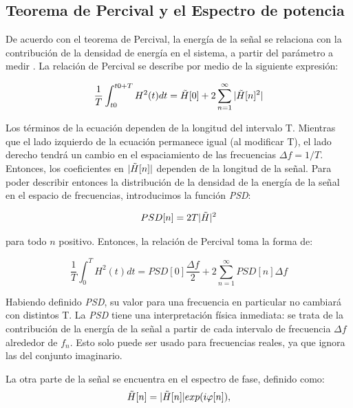 \subsection{Teorema de Percival y el Espectro de potencia}
\label{psd_section}
De acuerdo con el teorema de Percival, la energía de la señal se relaciona con la contribución de la densidad de energía en el sistema, a partir del parámetro a medir \parencite{book_analysis_Method_multiSp_data}. La relación de Percival se describe por medio de la siguiente expresión: 

\begin{equation}
    \frac{1}{T} \int_{t0}^{t0+T} H^2(t)dt = \Tilde{H}[0] + 2 \sum_{n=1}^\infty |\Tilde{H}[n]^2|
\end{equation}

Los términos de la ecuación dependen de la longitud del intervalo T. Mientras que el lado izquierdo de la ecuación permanece igual (al modificar T), el lado derecho tendrá un cambio en el espaciamiento de las frecuencias $\Delta f = 1/T$. Entonces, los coeficientes en $|\Tilde{H}[n]|$ dependen de la longitud de la señal. Para poder describir entonces la distribución de la densidad de la energía de la señal en el espacio de frecuencias, introducimos la función \emph{PSD}:

\begin{equation}
    PSD[n] = 2T |\Tilde{H}|^2
\end{equation}

para todo $n$ positivo. Entonces, la relación de Percival toma la forma de:

\begin{equation}
    \frac{1}{T} \int_0^T H^2 (t)dt = PSD[0] \frac{\Delta f}{2} +2 \sum_{n=1}^\infty PSD[n] \Delta f
\end{equation}

Habiendo definido \emph{PSD}, su valor para una frecuencia en particular no cambiará con distintos T. La \emph{PSD} tiene una interpretación física inmediata: se trata de la contribución de la energía de la señal a partir de cada intervalo de frecuencia $\Delta f$ alrededor de $f_n$. Esto solo puede ser usado para frecuencias reales, ya que ignora las del conjunto imaginario.
\vspace{1 em}

La otra parte de la señal se encuentra en el espectro de fase, definido como:
\begin{equation}
    \Tilde{H}[n] = |\Tilde{H}[n]| exp(i\varphi [n]), 
\end{equation}

